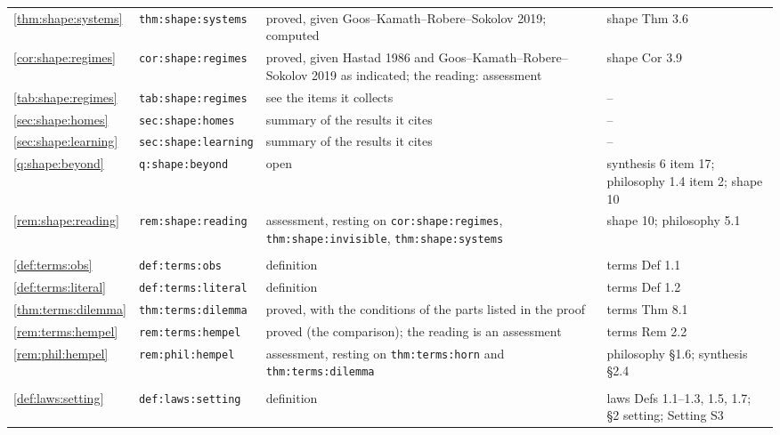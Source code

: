 {\begin{longtable}{@{}>{\raggedright\arraybackslash}p{}>{\raggedright\arraybackslash}p{}>{\raggedright\arraybackslash}p{}>{\raggedright\arraybackslash}p{}@{}}
\cref{thm:shape:systems} & \texttt{thm:\allowbreak shape:\allowbreak systems} & proved, given Goos--Kamath--Robere--Sokolov 2019; computed & shape Thm 3.6\\
\cref{cor:shape:regimes} & \texttt{cor:\allowbreak shape:\allowbreak regimes} & proved, given Hastad 1986 and Goos--Kamath--Robere--Sokolov 2019 as indicated; the reading: assessment & shape Cor 3.9\\
\cref{tab:shape:regimes} & \texttt{tab:\allowbreak shape:\allowbreak regimes} & see the items it collects & --\\
\cref{sec:shape:homes} & \texttt{sec:\allowbreak shape:\allowbreak homes} & summary of the results it cites & --\\
\cref{sec:shape:learning} & \texttt{sec:\allowbreak shape:\allowbreak learning} & summary of the results it cites & --\\
\cref{q:shape:beyond} & \texttt{q:\allowbreak shape:\allowbreak beyond} & open & synthesis 6 item 17; philosophy 1.4 item 2; shape 10\\
\cref{rem:shape:reading} & \texttt{rem:\allowbreak shape:\allowbreak reading} & assessment, resting on \texttt{cor:shape:regimes}, \texttt{thm:shape:invisible}, \texttt{thm:shape:systems} & shape 10; philosophy 5.1\\
\midrule
\multicolumn{4}{@{}l}{\texttt{terms.tex}}\\
\cref{def:terms:obs} & \texttt{def:\allowbreak terms:\allowbreak obs} & definition & terms Def 1.1\\
\cref{def:terms:literal} & \texttt{def:\allowbreak terms:\allowbreak literal} & definition & terms Def 1.2\\
\cref{thm:terms:dilemma} & \texttt{thm:\allowbreak terms:\allowbreak dilemma} & proved, with the conditions of the parts listed in the proof & terms Thm 8.1\\
\cref{rem:terms:hempel} & \texttt{rem:\allowbreak terms:\allowbreak hempel} & proved (the comparison); the reading is an assessment & terms Rem 2.2\\
\cref{rem:phil:hempel} & \texttt{rem:\allowbreak phil:\allowbreak hempel} & assessment, resting on \texttt{thm:terms:horn} and \texttt{thm:terms:dilemma} & philosophy \S1.6; synthesis \S2.4\\
\midrule
\multicolumn{4}{@{}l}{\texttt{laws.tex}}\\
\cref{def:laws:setting} & \texttt{def:\allowbreak laws:\allowbreak setting} & definition & laws Defs 1.1--1.3, 1.5, 1.7; \S2 setting; Setting S3\\

\end{longtable}}
